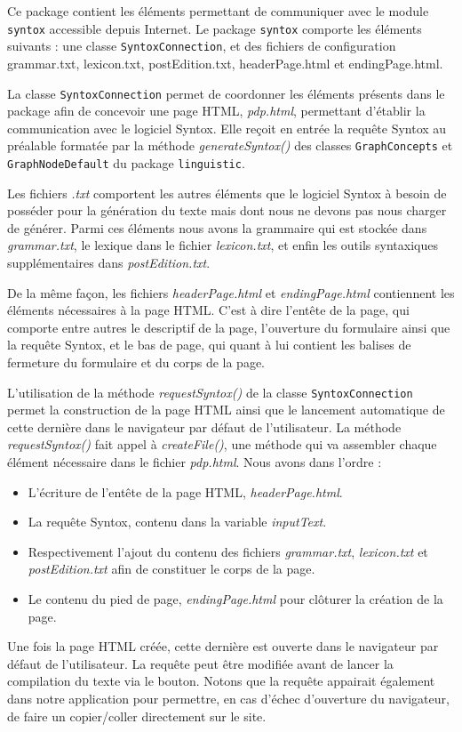 \documentclass[12pt]{report}
\begin{document}
Ce package contient les éléments permettant de communiquer avec le module \texttt{syntox} accessible depuis Internet. Le package \texttt{syntox} comporte les éléments suivants : une classe \texttt{SyntoxConnection}, et des fichiers de configuration grammar.txt, lexicon.txt, postEdition.txt, headerPage.html et endingPage.html.

\bigskip
La classe \texttt{SyntoxConnection} permet de coordonner les éléments présents dans le package afin de concevoir une page HTML, \emph{pdp.html}, permettant d'établir la communication avec le logiciel Syntox. Elle reçoit en entrée la requête Syntox au préalable formatée par la méthode \emph{generateSyntox()} des classes \texttt{GraphConcepts} et \texttt{GraphNodeDefault} du package \texttt{linguistic}. 

\bigskip
Les fichiers \emph{.txt} comportent les autres éléments que le logiciel Syntox à besoin de posséder pour la génération du texte mais dont nous ne devons pas nous charger de générer. Parmi ces éléments nous avons la grammaire qui est stockée dans \emph{grammar.txt}, le lexique dans le fichier \emph{lexicon.txt}, et enfin les outils syntaxiques supplémentaires dans \emph{postEdition.txt}. 

\bigskip
De la même façon, les fichiers \emph{headerPage.html} et \emph{endingPage.html} contiennent les éléments nécessaires à la page HTML. C'est à dire l'entête de la page, qui comporte entre autres le descriptif de la page, l'ouverture du formulaire ainsi que la requête Syntox, et le bas de page, qui quant à lui contient les balises de fermeture du formulaire et du corps de la page. 

\bigskip
   
   L'utilisation de la méthode \emph{requestSyntox()} de la classe \texttt{SyntoxConnection} permet la construction de la page HTML ainsi que le lancement automatique de cette dernière dans le navigateur par défaut de l'utilisateur. 
\bigskip
La méthode \emph{requestSyntox()} fait appel à \emph{createFile()}, une méthode qui va assembler chaque élément nécessaire dans le fichier \emph{pdp.html}. Nous avons dans l'ordre : 
\begin{itemize}
\item L'écriture de l'entête de la page HTML, \emph{headerPage.html}. 
\item La requête Syntox, contenu dans la variable \emph{inputText}. 
\item Respectivement l'ajout du contenu des fichiers \emph{grammar.txt},  \emph{lexicon.txt} et \emph{postEdition.txt} afin de constituer le corps de la page. 
\item Le contenu du pied de page, \emph{endingPage.html} pour clôturer la création de la page. 
\end{itemize}
\bigskip 
Une fois la page HTML créée, cette dernière est ouverte dans le navigateur par défaut de l'utilisateur. La requête peut être modifiée avant de lancer la compilation du texte via le bouton. Notons que la requête appairait également dans notre application pour permettre, en cas d'échec d'ouverture du navigateur, de faire un copier/coller directement sur le site.
\end{document}
